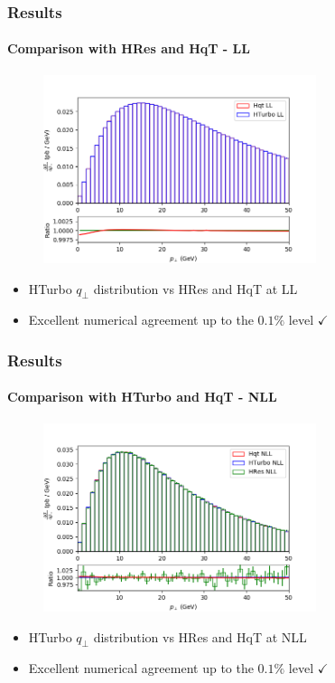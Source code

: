 \documentclass[aspectratio=43]{beamer}
\begin{document}
\begin{frame}
	
	\frametitle{Results}
	\framesubtitle{Comparison with HRes and HqT - LL}
	
	\begin{figure}
		\includegraphics[width = 8cm]{plots/hturbo_LL.png}
	\end{figure}
	
	\begin{itemize}
		\item \footnotesize HTurbo $q_{\perp}$ distribution vs HRes and HqT at LL
		\item \footnotesize Excellent numerical agreement up to the $0.1\%$ level {\color{darkgreen}$\checkmark$} 
	\end{itemize}

\end{frame}

\begin{frame}

	\frametitle{Results}
	\framesubtitle{Comparison with HTurbo and HqT - NLL}
	
	\begin{figure}
		\includegraphics[width = 8cm]{plots/hturbo_NLL.png}
	\end{figure}
	
	\begin{itemize}
		\item \footnotesize HTurbo $q_{\perp}$ distribution vs HRes and HqT at NLL
		\item \footnotesize Excellent numerical agreement up to the $0.1\%$ level {\color{darkgreen}$\checkmark$} 
	\end{itemize}

\end{frame}
\end{document}
